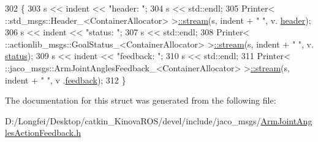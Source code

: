 \begin{DoxyCode}
302   \{
303     s << indent << \textcolor{stringliteral}{"header: "};
304     s << std::endl;
305     Printer< ::std\_msgs::Header\_<ContainerAllocator> >\hyperlink{structros_1_1message__operations_1_1Printer_3_01_1_1jaco__msgs_1_1ArmJointAnglesActionFeedback__786902009de7467387c5cc1d1cad3c62_ac02c303b051efc94bf4e0f01715d6482}{::stream}(s, indent + \textcolor{stringliteral}{"  "}, v.
      \hyperlink{structjaco__msgs_1_1ArmJointAnglesActionFeedback___a2b6e6babc148c8a60d9c87aec1345010}{header});
306     s << indent << \textcolor{stringliteral}{"status: "};
307     s << std::endl;
308     Printer< ::actionlib\_msgs::GoalStatus\_<ContainerAllocator> >\hyperlink{structros_1_1message__operations_1_1Printer_3_01_1_1jaco__msgs_1_1ArmJointAnglesActionFeedback__786902009de7467387c5cc1d1cad3c62_ac02c303b051efc94bf4e0f01715d6482}{::stream}(s, indent + \textcolor{stringliteral}{"  "}, v.
      \hyperlink{structjaco__msgs_1_1ArmJointAnglesActionFeedback___a3ad6f5a7e798c60a78a6ffcb225a20a0}{status});
309     s << indent << \textcolor{stringliteral}{"feedback: "};
310     s << std::endl;
311     Printer< ::jaco\_msgs::ArmJointAnglesFeedback\_<ContainerAllocator> >\hyperlink{structros_1_1message__operations_1_1Printer_3_01_1_1jaco__msgs_1_1ArmJointAnglesActionFeedback__786902009de7467387c5cc1d1cad3c62_ac02c303b051efc94bf4e0f01715d6482}{::stream}(s, indent + \textcolor{stringliteral}{"  "}, v
      .\hyperlink{structjaco__msgs_1_1ArmJointAnglesActionFeedback___a1bdadb7a4a611607e135e734a94fb74a}{feedback});
312   \}
\end{DoxyCode}


The documentation for this struct was generated from the following file\+:\begin{DoxyCompactItemize}
\item 
D\+:/\+Longfei/\+Desktop/catkin\+\_\+\+Kinova\+R\+O\+S/devel/include/jaco\+\_\+msgs/\hyperlink{ArmJointAnglesActionFeedback_8h}{Arm\+Joint\+Angles\+Action\+Feedback.\+h}\end{DoxyCompactItemize}
